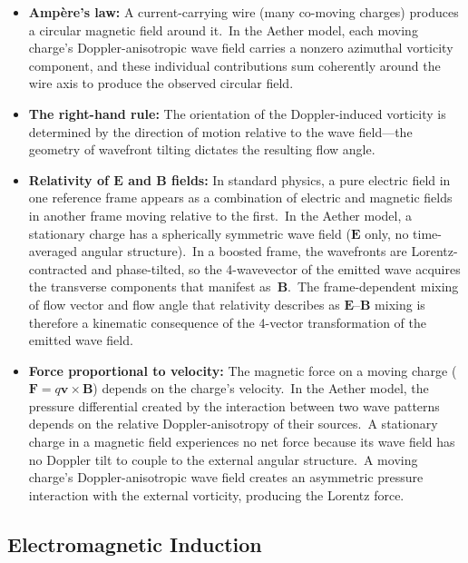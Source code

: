 ﻿\documentclass[12pt,letterpaper]{article}
\begin{document}
\begin{itemize}[leftmargin=2em]
  \item \textbf{Amp\`ere's law:} A current-carrying wire (many co-moving charges) produces a
    circular magnetic field around it.\ In the Aether model, each moving charge's
    Doppler-anisotropic wave field carries a nonzero azimuthal vorticity component, and
    these individual contributions sum coherently around the wire axis to produce the
    observed circular field.

  \item \textbf{The right-hand rule:} The orientation of the Doppler-induced vorticity is
    determined by the direction of motion relative to the wave field---the geometry of
    wavefront tilting dictates the resulting flow angle.

  \item \textbf{Relativity of $\mathbf{E}$ and $\mathbf{B}$ fields:} In standard physics, a pure
    electric field in one reference frame appears as a combination of electric and
    magnetic fields in another frame moving relative to the first.\ In the Aether model,
    a stationary charge has a spherically symmetric wave field ($\mathbf{E}$ only, no
    time-averaged angular structure).\ In a boosted frame, the wavefronts are Lorentz-
    contracted and phase-tilted, so the 4-wavevector of the emitted wave acquires the
    transverse components that manifest as~$\mathbf{B}$.\ The frame-dependent mixing of
    flow vector and flow angle that relativity describes as $\mathbf{E}$--$\mathbf{B}$
    mixing is therefore a kinematic consequence of the 4-vector transformation of the
    emitted wave field.

  \item \textbf{Force proportional to velocity:} The magnetic force on a moving charge
    ($\mathbf{F} = q\mathbf{v} \times \mathbf{B}$) depends on the charge's velocity.\ In the
    Aether model, the pressure differential created by the interaction between two wave
    patterns depends on the relative Doppler-anisotropy of their sources.\ A stationary
    charge in a magnetic field experiences no net force because its wave field has no
    Doppler tilt to couple to the external angular structure.\ A moving charge's
    Doppler-anisotropic wave field creates an asymmetric pressure interaction with the
    external vorticity, producing the Lorentz force.
\end{itemize}


\subsection{Electromagnetic Induction}
\end{document}
